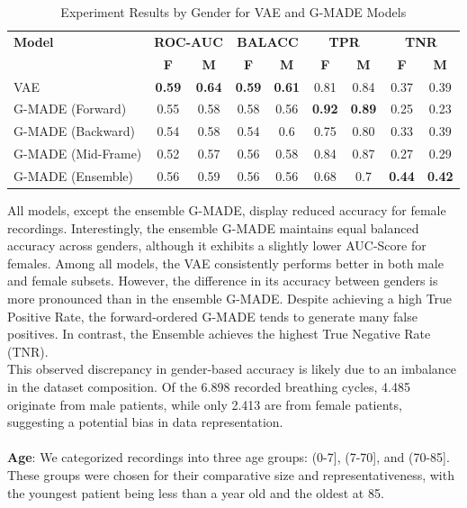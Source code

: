 \begin{table}[h!]
    \centering
    \caption{Experiment Results by Gender for VAE and G-MADE Models}
    \begin{tabular}{|l||c|c||c|c||c|c||c|c|}
    \hline
    \textbf{Model} & \multicolumn{2}{c||}{\textbf{ROC-AUC}} & \multicolumn{2}{c||}{\textbf{BALACC}} & \multicolumn{2}{c||}{\textbf{TPR}} & \multicolumn{2}{c|}{\textbf{TNR}} \\
    \cline{2-9}
    & \textbf{F} & \textbf{M} & \textbf{F} & \textbf{M} & \textbf{F} & \textbf{M} & \textbf{F} & \textbf{M} \\
    \hline
    VAE & \textbf{0.59} & \textbf{0.64} & \textbf{0.59} & \textbf{0.61} & 0.81 & 0.84 & 0.37 & 0.39 \\
    G-MADE (Forward) & 0.55 & 0.58 & 0.58 & 0.56 & \textbf{0.92} & \textbf{0.89} & 0.25 & 0.23 \\
    G-MADE (Backward) & 0.54 & 0.58 & 0.54 & 0.6 & 0.75 & 0.80 & 0.33 & 0.39 \\
    G-MADE (Mid-Frame) & 0.52 & 0.57 & 0.56 & 0.58 & 0.84 & 0.87 & 0.27 & 0.29 \\
    G-MADE (Ensemble) & 0.56 & 0.59 & 0.56 & 0.56 & 0.68 & 0.7 & \textbf{0.44} & \textbf{0.42} \\
    \hline
    \end{tabular}
\end{table}
All models, except the ensemble G-MADE, display reduced accuracy for female recordings. Interestingly, the ensemble G-MADE maintains equal balanced accuracy across genders, although it exhibits a slightly lower AUC-Score for females. Among all models, the VAE consistently performs better in both male and female subsets. However, the difference in its accuracy between genders is more pronounced than in the ensemble G-MADE. Despite achieving a high True Positive Rate, the forward-ordered G-MADE tends to generate many false positives. In contrast, the Ensemble achieves the highest True Negative Rate (TNR).\\
This observed discrepancy in gender-based accuracy is likely due to an imbalance in the dataset composition. Of the 6.898 recorded breathing cycles, 4.485 originate from male patients, while only 2.413 are from female patients, suggesting a potential bias in data representation.\\\\
\textbf{Age}: We categorized recordings into three age groups: (0-7], (7-70], and (70-85]. These groups were chosen for their comparative size and representativeness, with the youngest patient being less than a year old and the oldest at 85.

